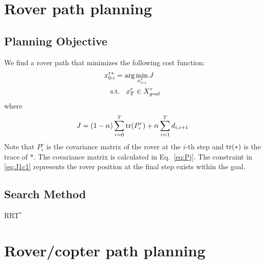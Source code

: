 \documentclass[conference]{IEEEtran}
\begin{document}

\section{Rover path planning}\label{sec:r}
\subsection{Planning Objective}
We find a rover path that minimizes the following cost function:
\begin{align}
  &x^{r*}_{0:i}={\rm arg} \min_{x^r_{0:i}} J\\
  &\hspace{3mm}{\rm s.t.}\hspace{3mm}x^r_{T} \in X^r_{goal}\label{eq:J1c1}\\
\end{align}
where
\begin{align}
    J=(1-\alpha) \sum^T_{i=0}  {\rm tr}(P^r_i) +\alpha \sum^T_{i=1} d_{i,i+1}
\end{align}
Note that $P^r_i$ is the covariance matrix of the rover at the $i$-th step and ${\rm tr}(*)$ is the trace of $*$. The covariance matrix is calculated in Eq.~\eqref{eq:Pj}. The constraint in \eqref{eq:J1c1} represents the rover position at the final step exists within the goal.

\subsection{Search Method}
RRT$^*$

\section{Rover/copter path planning}\label{sec:r/c}
\end{document}
